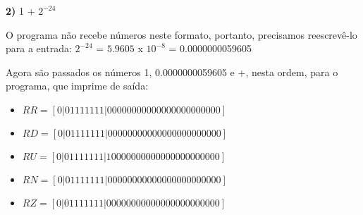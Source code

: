 \documentclass[11pt]{article}
\begin{document}
\textbf{2)} 1 + $ 2^{-24} $

O programa não recebe números neste formato, portanto, precisamos reescrevê-lo para a entrada:
$ 2^{-24} $ = $ 5.9605 $ x $10^{-8} $ = 0.0000000059605

Agora são passados os números 1, 0.0000000059605 e +, nesta ordem, para o programa, que imprime de saída:

\begin{itemize}
  \item {\small$ RR = [ 0 | 0 1 1 1 1 1 1 1 | 0 0 0 0 0 0 0 0 0 0 0 0 0 0 0 0 0 0 0 0 0 0 0 ] $}
  \item {\small$ RD = [ 0 | 0 1 1 1 1 1 1 1 | 0 0 0 0 0 0 0 0 0 0 0 0 0 0 0 0 0 0 0 0 0 0 0 ] $}
  \item {\small$ RU = [ 0 | 0 1 1 1 1 1 1 1 | 1 0 0 0 0 0 0 0 0 0 0 0 0 0 0 0 0 0 0 0 0 0 0 ] $}
  \item {\small$ RN = [ 0 | 0 1 1 1 1 1 1 1 | 0 0 0 0 0 0 0 0 0 0 0 0 0 0 0 0 0 0 0 0 0 0 0 ] $}
  \item {\small$ RZ = [ 0 | 0 1 1 1 1 1 1 1 | 0 0 0 0 0 0 0 0 0 0 0 0 0 0 0 0 0 0 0 0 0 0 0 ] $}
\end{itemize}
\end{document}
